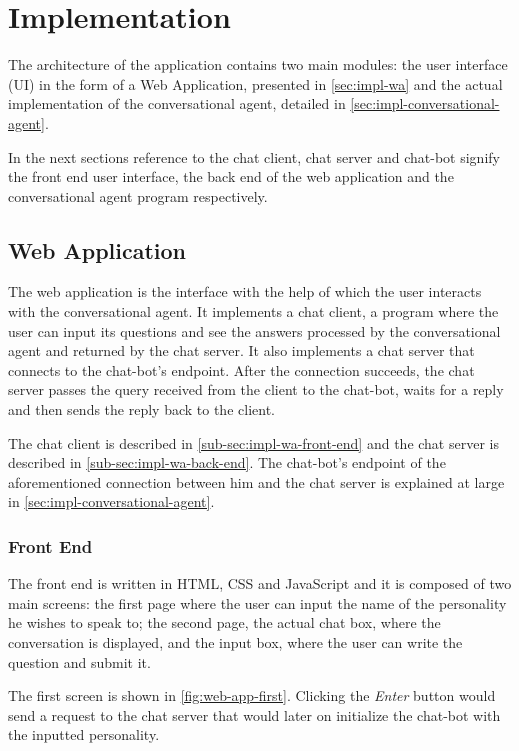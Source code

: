 \chapter{Implementation}
\label{chapter:implementation}

The architecture of the application contains two main modules: the user interface (UI) in the form of a Web Application, presented in \autoref{sec:impl-wa} and the actual implementation of the conversational agent, detailed in \autoref{sec:impl-conversational-agent}.

In the next sections reference to the chat client, chat server and chat-bot signify the front end user interface, the back end of the web application and the conversational agent program respectively.

\section{Web Application}
\label{sec:impl-wa}

The web application is the interface with the help of which the user interacts with the conversational agent. It implements a chat client, a program where the user can input its questions and see the answers processed by the conversational agent and returned by the chat server. It also implements a chat server that connects to the chat-bot's endpoint. After the connection succeeds, the chat server passes the query received from the client to the chat-bot, waits for a reply and then sends the reply back to the client.

The chat client is described in \autoref{sub-sec:impl-wa-front-end} and the chat server is described in \autoref{sub-sec:impl-wa-back-end}. The chat-bot's endpoint of the aforementioned connection between him and the chat server is explained at large in \autoref{sec:impl-conversational-agent}.

\subsection{Front End}
\label{sub-sec:impl-wa-front-end}

The front end is written in HTML, CSS and JavaScript and it is composed of two main screens: the first page where the user can input the name of the personality he wishes to speak to; the second page, the actual chat box, where the conversation is displayed, and the input box, where the user can write the question and submit it.

The first screen is shown in \autoref{fig:web-app-first}. Clicking the {\em Enter} button would send a request to the chat server that would later on initialize the chat-bot with the inputted personality.

